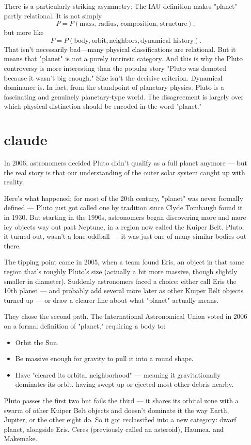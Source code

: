 There is a particularly striking asymmetry:
The IAU definition makes "planet" partly relational.
It is not simply
$$ P=P(\text{mass, radius, composition, structure}), $$
but more like
$$ P=P(\text{body},\text{orbit},\text{neighbors},\text{dynamical history}). $$
That isn't necessarily bad—many physical classifications are relational. But it means that "planet" is not a purely intrinsic category.
And this is why the Pluto controversy is more interesting than the popular story "Pluto was demoted because it wasn't big enough." Size isn't the decisive criterion. Dynamical dominance is.
In fact, from the standpoint of planetary physics, Pluto is a fascinating and genuinely planetary-type world. The disagreement is largely over which physical distinction should be encoded in the word "planet."


\section{claude}
In 2006, astronomers decided Pluto didn't qualify as a full planet anymore — but the real story is that our understanding of the outer solar system caught up with reality.

Here's what happened: for most of the 20th century, "planet" was never formally defined — Pluto just got called one by tradition since Clyde Tombaugh found it in 1930. But starting in the 1990s, astronomers began discovering more and more icy objects way out past Neptune, in a region now called the Kuiper Belt. Pluto, it turned out, wasn't a lone oddball — it was just one of many similar bodies out there.

The tipping point came in 2005, when a team found Eris, an object in that same region that's roughly Pluto's size (actually a bit more massive, though slightly smaller in diameter). Suddenly astronomers faced a choice: either call Eris the 10th planet — and probably add several more later as other Kuiper Belt objects turned up — or draw a clearer line about what "planet" actually means.


They chose the second path. The International Astronomical Union voted in 2006 on a formal definition of "planet," requiring a body to:
\begin{itemize}
   \item Orbit the Sun.
   \item Be massive enough for gravity to pull it into a round shape.
   \item Have "cleared its orbital neighborhood" — meaning it gravitationally dominates its orbit, having swept up or ejected most other debris nearby.
\end{itemize}
Pluto passes the first two but fails the third — it shares its orbital zone with a swarm of other Kuiper Belt objects and doesn't dominate it the way Earth, Jupiter, or the other eight do. So it got reclassified into a new category: dwarf planet, alongside Eris, Ceres (previously called an asteroid), Haumea, and Makemake.

